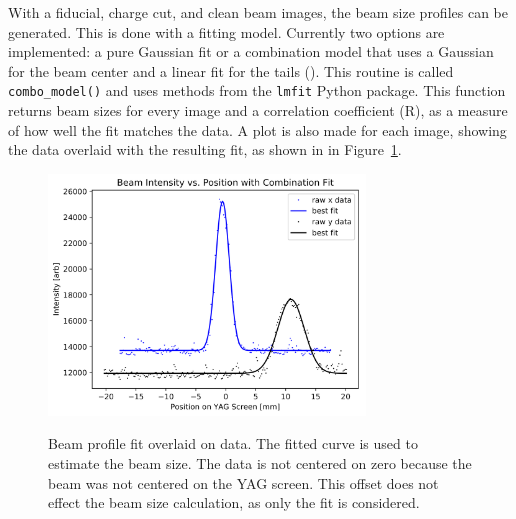 With a fiducial, charge cut, and clean beam images, the beam size profiles can be generated.
This is done with a fitting model. Currently two options are implemented:
a pure Gaussian fit or a combination model that uses a Gaussian for 
the beam center and a linear fit for the tails ().
This routine is called \verb|combo_model()| and uses methods from 
the \verb|lmfit| Python package.
This function returns beam sizes for every image and 
a correlation coefficient (R), as a measure of how well the fit matches the data. 
A plot is also made for each image, showing the data overlaid with 
the resulting fit, as shown in in Figure~\ref{fig:combo}.  
\begin{figure}
	\centering
	\includegraphics[width=0.75\textwidth]{images/combomodel}
	\label{fig:combo}
	\caption{Beam profile fit overlaid on data. 
		The fitted curve is used to estimate the beam size.
	The data is not centered on zero because the beam was not centered on the YAG screen.
	This offset does not effect the beam size calculation, as only the fit is considered.}
\end{figure}

